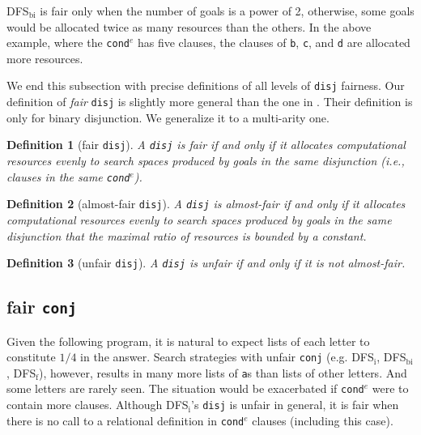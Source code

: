 \documentclass[format=acmlarge, review=true, authordraft=true]{acmart}
\newcommand{\conde}{\texttt{cond$^e$}}
\newcommand{\conj}{\texttt{conj}}
\newcommand{\disj}{\texttt{disj}}
\newcommand{\DFSi }[0]{DFS$_\textrm{i}$}
\newcommand{\DFSf }[0]{DFS$_\textrm{f}$}
\newcommand{\DFSbi}[0]{DFS$_\textrm{bi}$}
\newtheorem{defn}{Definition}[section]
\begin{document}
\begin{center}
	\begin{tabular}{c}
		
	\end{tabular}
\end{center}

\DFSbi{} is fair only when the number of goals is a power of 2, 
otherwise, some goals would be allocated twice as many resources than the 
others. In the above example, where the \conde{} has five clauses, the clauses 
of \texttt{b}, \texttt{c}, and \texttt{d} are allocated more resources.

We end this subsection with precise definitions of all levels of 
\disj{} fairness. Our definition of \emph{fair} \disj{} is slightly 
more general
than the one in \citet{seres1999algebra}. Their definition is only
for binary disjunction. We generalize it to a multi-arity one.

\begin{defn}[fair \disj{}]
A \disj{} is fair if and only if it allocates computational resources evenly to 
search spaces produced by goals in the same disjunction 
(i.e., clauses in the same \conde).
\end{defn}

\begin{defn}[almost-fair \disj{}]
A \disj{} is almost-fair if and only if it allocates computational resources
evenly to search spaces produced by goals in the same disjunction that 
the maximal ratio of resources is bounded by a constant.
\end{defn}

\begin{defn}[unfair \disj{}]
A \disj{} is unfair if and only if it is not almost-fair.
\end{defn}

\subsection{fair \texttt{conj}}


Given the following program, it is natural to expect lists of each letter to
constitute $1/4$ in the answer. Search strategies with unfair \conj{} (e.g. 
\DFSi, \DFSbi, \DFSf), however, results in many more lists of \texttt{a}s than 
lists of other letters. And some letters are rarely seen. The situation would 
be exacerbated if \conde{} were to contain more clauses. Although 
DFS$_\textrm{i}$'s \disj{} is unfair in general, it is fair when there is no 
call to a relational definition in \conde{} clauses (including this case).
\end{document}
